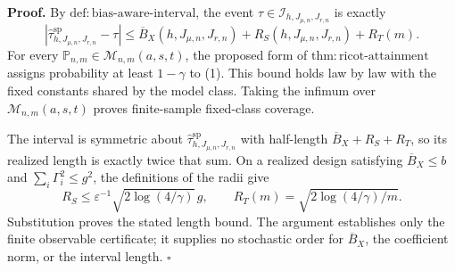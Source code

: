 \textbf{Proof.}
By \(\mathrm{def:bias\text{-}aware\text{-}interval}\), the event \(\tau\in\mathcal I_{h,J_{\mu,n},J_{r,n}}\) is exactly
\[
\left|\widehat\tau^{\mathrm{sp}}_{h,J_{\mu,n},J_{r,n}}-\tau\right|
\le\overline B_X(h,J_{\mu,n},J_{r,n})+R_S(h,J_{\mu,n},J_{r,n})+R_T(m).
\tag{1}
\]
For every \(\mathbb P_{n,m}\in\mathcal M_{n,m}(a,s,t)\), the proposed form of \(\mathrm{thm:ricot\text{-}attainment}\) assigns probability at least \(1-\gamma\) to (1). This bound holds law by law with the fixed constants shared by the model class. Taking the infimum over \(\mathcal M_{n,m}(a,s,t)\) proves finite-sample fixed-class coverage.

The interval is symmetric about \(\widehat\tau^{\mathrm{sp}}_{h,J_{\mu,n},J_{r,n}}\) with half-length \(\overline B_X+R_S+R_T\), so its realized length is exactly twice that sum. On a realized design satisfying \(\overline B_X\le b\) and \(\sum_i\Gamma_i^2\le g^2\), the definitions of the radii give
\[
R_S\le\varepsilon^{-1}\sqrt{2\log(4/\gamma)}\,g,
\qquad
R_T(m)=\sqrt{2\log(4/\gamma)/m}.
\]
Substitution proves the stated length bound. The argument establishes only the finite observable certificate; it supplies no stochastic order for \(\overline B_X\), the coefficient norm, or the interval length. \(\square\)